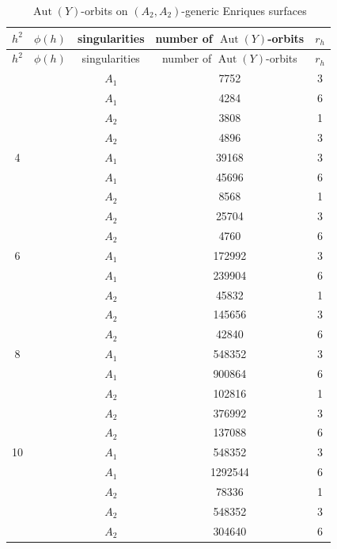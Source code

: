 \documentclass{amsart}
\theoremstyle{definition}
\theoremstyle{plain}
\DeclareMathOperator{\Aut}{Aut}
\begin{document}
\renewcommand{\arraystretch}{1.3}
 \begin{longtable}{ccccc}
 \caption{$\Aut(Y)$-orbits on $(A_2,A_2)$-generic Enriques surfaces}\\
\toprule
$h^2$ &$\phi(h)$&  singularities & number of $\Aut(Y)$-orbits & $r_h$\\
\hline
  \endfirsthead
 \toprule
$h^2$ &$\phi(h)$&  singularities & number of $\Aut(Y)$-orbits & $r_h$ \\
\hline
\endhead
 \endfoot
 \endlastfoot
2 & & \(A_{1} \) &7752 & 3 \\
 & & \(A_{1} \) &4284 & 6 \\
 & & \(A_{2} \) &3808 & 1 \\
 & & \(A_{2} \) &4896 & 3 \\
4 & & \(A_{1} \) &39168 & 3 \\
 & & \(A_{1} \) &45696 & 6 \\
 & & \(A_{2} \) &8568 & 1 \\
 & & \(A_{2} \) &25704 & 3 \\
 & & \(A_{2} \) &4760 & 6 \\
6 & & \(A_{1} \) &172992 & 3 \\
 & & \(A_{1} \) &239904 & 6 \\
 & & \(A_{2} \) &45832 & 1 \\
 & & \(A_{2} \) &145656 & 3 \\
 & & \(A_{2} \) &42840 & 6 \\
8 & & \(A_{1} \) &548352 & 3 \\
 & & \(A_{1} \) &900864 & 6 \\
 & & \(A_{2} \) &102816 & 1 \\
 & & \(A_{2} \) &376992 & 3 \\
 & & \(A_{2} \) &137088 & 6 \\
10 & & \(A_{1} \) &548352 & 3 \\
 & & \(A_{1} \) &1292544 & 6 \\
 & & \(A_{2} \) &78336 & 1 \\
 & & \(A_{2} \) &548352 & 3 \\
 & & \(A_{2} \) &304640 & 6 \\
 \bottomrule
\end{longtable}
\end{document}
